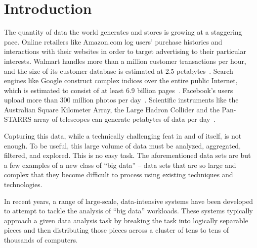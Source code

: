 \chapter{Introduction}

The quantity of data the world generates and stores is growing at a staggering
pace. Online retailers like Amazon.com log users' purchase histories and
interactions with their websites in order to target advertising to their
particular interests. Walmart handles more than a million customer transactions
per hour, and the size of its customer database is estimated at 2.5
petabytes~\cite{economist-data-data-everywhere}. Search engines like Google
construct complex indices over the entire public Internet, which is estimated
to consist of at least 6.9 billion pages~\cite{worldwidewebsize}. Facebook's
users upload more than 300 million photos per
day~\cite{jay-parikh-slideshow}. Scientific instruments like the Australian
Square Kilometer Array, the Large Hadron Collider and the Pan-STARRS array of
telescopes can generate petabytes of data per day~\cite{fourth-paradigm}.

Capturing this data, while a technically challenging feat in and of itself, is
not enough. To be useful, this large volume of data must be analyzed,
aggregated, filtered, and explored. This is no easy task. The aforementioned
data sets are but a few examples of a new class of ``big data'' -- data sets
that are so large and complex that they become difficult to process using
existing techniques and technologies.

In recent years, a range of large-scale, data-intensive systems have been
developed to attempt to tackle the analysis of ``big data'' workloads. These
systems typically approach a given data analysis task by breaking the task into
logically separable pieces and then distributing those pieces across a cluster
of tens to tens of thousands of computers.
